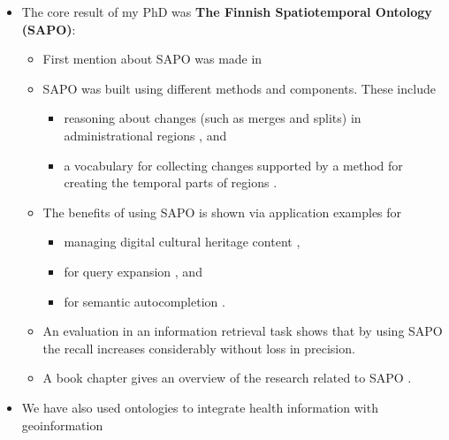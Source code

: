 \documentclass[11pt,letterpaper]{article}
\begin{document}
\begin{itemize}
\item The core result of my PhD \cite{kauppinen-dissertation-2010} was \textbf{The Finnish Spatiotemporal Ontology (SAPO)}:
\begin{itemize}
\item First mention about SAPO was made in
\cite{kauppinen-hyvonen-bridging-the-semantic-2004}
\item SAPO was built
using different methods and components. These
include
\begin{itemize}
  \item reasoning about changes (such as merges and splits) in
administrational regions
\cite{kauppinen-ontology-time-series-book-2007} \cite{kauppinen-hyvonen-modeling-coverage-between-2005}
		\cite{kauppinen-geospatialreasoning-ijcai05}
		, and
\item a vocabulary for
		collecting changes supported by a method for creating the temporal parts of
		regions \cite{kauppinen-et-al-ontology-time-series-2008}.
\end{itemize}
\item The benefits of
		using SAPO is shown via application examples for
\begin{itemize}		\item managing digital cultural
		heritage content
		\cite{kauppinen-et-al-geospatio-temporal-2010},
		\item for query expansion
		\cite{tuominen-et-al-onki-query-expansion-2009}, and
\item for semantic
autocompletion \cite{sinkkila-et-al-irma-2008}. \end{itemize}
\item An evaluation in
		an information retrieval task shows
		\cite{kauppinen-et-al-geospatio-temporal-2010} that by using SAPO the recall
		increases considerably without loss in precision.
		\item A book chapter gives an
		overview of the research related to SAPO \cite{sapo-in-book-2011}.
\end{itemize}

\item We have also used ontologies to integrate health information with
  geoinformation
  		\cite{info:doi/10.2196/medinform.3531} \cite{geo-health-2012}



\end{itemize}
\end{document}
